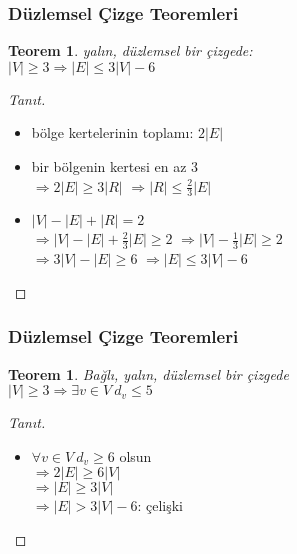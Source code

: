 \documentclass[dvipsnames]{beamer}
\theoremstyle{definition}
\theoremstyle{example}
\theoremstyle{plain}
\newtheorem{teorem}[theorem]{Teorem}
\begin{document}
\begin{frame}
  \frametitle{Düzlemsel Çizge Teoremleri}

  \begin{teorem}
    yalın, düzlemsel bir çizgede:\\
    $|V| \geq 3 \Rightarrow |E| \leq 3 |V| - 6$
  \end{teorem}

  \pause
  \begin{proof}[Tanıt]
    \begin{itemize}
      \item bölge kertelerinin toplamı: $2 |E|$

      \pause
      \item bir bölgenin kertesi en az $3$\\
        \pause
        $\Rightarrow 2 |E| \geq 3 |R|$
        \pause
        $\Rightarrow |R| \leq \frac{2}{3} |E|$

      \pause
      \item $|V| - |E| + |R| = 2$\\
        \pause
        $\Rightarrow |V| - |E| + \frac{2}{3} |E| \geq 2$
        \pause
        $\Rightarrow |V| - \frac{1}{3} |E| \geq 2$\\
        \pause
        $\Rightarrow 3 |V| - |E| \geq 6$
        \pause
        $\Rightarrow |E| \leq 3 |V| - 6$\\
    \end{itemize}
  \end{proof}
\end{frame}

\begin{frame}
  \frametitle{Düzlemsel Çizge Teoremleri}

  \begin{teorem}
    Bağlı, yalın, düzlemsel bir çizgede\\
    $|V| \geq 3 \Rightarrow \exists v \in V~d_v \leq 5$
  \end{teorem}

  \pause
  \begin{proof}[Tanıt]
    \begin{itemize}
      \item $\forall v \in V~d_v \geq 6$ olsun\\
        \pause
        $\Rightarrow 2 |E| \geq 6 |V|$\\
        \pause
        $\Rightarrow |E| \geq 3 |V|$\\
        \pause
        $\Rightarrow |E| > 3 |V| - 6$: \alert{çelişki}
    \end{itemize}
  \end{proof}
\end{frame}
\end{document}
